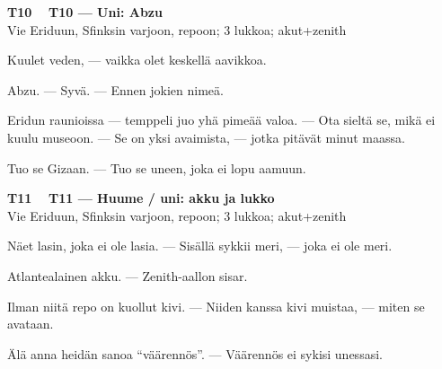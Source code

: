 \documentclass[a4paper,11pt]{article}
\begin{document}
\filbreak
\vspace{0.9mm}
\noindent
\begin{tcolorbox}[
  colframe=tothcol,
  colback=white,
  boxrule=0.8pt,
  arc=0pt,
  outer arc=0pt,
  left=2.5mm, right=2.5mm, top=2mm, bottom=2mm,
  boxsep=0.5mm,
  sharp corners,
  enhanced,
  breakable=false
]
{\large\ttfamily\bfseries T10}~~
{\normalsize\bfseries T10 --- Uni: Abzu}\\[0.2em]
{\small\color{black!65} Vie Eriduun, Sfinksin varjoon, repoon; 3 lukkoa; akut+zenith}\\[0.35em]
{\normalsize\raggedright Kuulet veden, --- vaikka olet keskellä aavikkoa.

Abzu. --- Syvä. --- Ennen jokien nimeä.

Eridun raunioissa --- temppeli juo yhä pimeää valoa. --- Ota sieltä se, mikä ei kuulu museoon. --- Se on yksi avaimista, --- jotka pitävät minut maassa.

Tuo se Gizaan. --- Tuo se uneen, joka ei lopu aamuun.}
\end{tcolorbox}

\filbreak
\vspace{0.9mm}
\noindent
\begin{tcolorbox}[
  colframe=tothcol,
  colback=white,
  boxrule=0.8pt,
  arc=0pt,
  outer arc=0pt,
  left=2.5mm, right=2.5mm, top=2mm, bottom=2mm,
  boxsep=0.5mm,
  sharp corners,
  enhanced,
  breakable=false
]
{\large\ttfamily\bfseries T11}~~
{\normalsize\bfseries T11 --- Huume / uni: akku ja lukko}\\[0.2em]
{\small\color{black!65} Vie Eriduun, Sfinksin varjoon, repoon; 3 lukkoa; akut+zenith}\\[0.35em]
{\normalsize\raggedright Näet lasin, joka ei ole lasia. --- Sisällä sykkii meri, --- joka ei ole meri.

Atlantealainen akku. --- Zenith-aallon sisar.

Ilman niitä repo on kuollut kivi. --- Niiden kanssa kivi muistaa, --- miten se avataan.

Älä anna heidän sanoa ``väärennös''. --- Väärennös ei sykisi unessasi.}
\end{tcolorbox}
\end{document}
